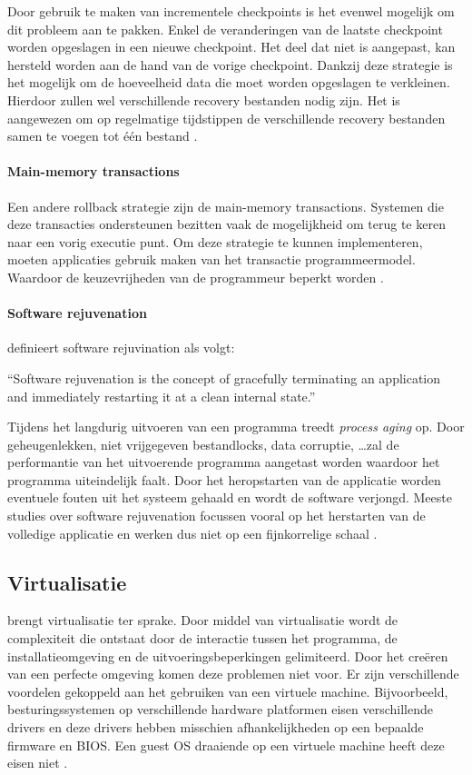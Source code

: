 Door gebruik te maken van incrementele checkpoints is het evenwel mogelijk om dit probleem aan te pakken.
Enkel de veranderingen van de laatste checkpoint worden opgeslagen in een nieuwe checkpoint.
Het deel dat niet is aangepast, kan hersteld worden aan de hand van de vorige checkpoint.
Dankzij deze strategie is het mogelijk om de hoeveelheid data die moet worden opgeslagen te verkleinen.
Hierdoor zullen wel verschillende recovery bestanden nodig zijn.
Het is aangewezen om op regelmatige tijdstippen de verschillende recovery bestanden samen te voegen tot één bestand \citep{plank1994libckpt, elnozahy2002survey}.

\paragraph{Main-memory transactions}
Een andere rollback strategie zijn de main-memory transactions.
Systemen die deze transacties ondersteunen bezitten vaak de mogelijkheid om terug te keren naar een vorig executie punt.
Om deze strategie te kunnen implementeren, moeten applicaties gebruik maken van het transactie programmeermodel.
Waardoor de keuzevrijheden van de programmeur beperkt worden \citep{srinivasan2004flashback}.

\paragraph{Software rejuvenation}
\citet{huang1995software} definieert software rejuvination als volgt:
\begin{displayquote}
``Software rejuvenation is the concept of gracefully terminating an application and immediately restarting it at a clean internal state.''
\end{displayquote}
Tijdens het langdurig uitvoeren van een programma treedt \emph{process aging} op.
Door geheugenlekken, niet vrijgegeven bestandlocks, data corruptie, \ldots zal de performantie van het uitvoerende programma aangetast worden waardoor het programma uiteindelijk faalt.
Door het heropstarten van de applicatie worden eventuele fouten uit het systeem gehaald en wordt de software verjongd.
Meeste studies over software rejuvenation focussen vooral op het herstarten van de volledige applicatie en werken dus niet op een fijnkorrelige schaal \citep{srinivasan2004flashback}.

\subsection{Virtualisatie}\label{sec:virtualisatie}
\citet{softwareDeployment} brengt virtualisatie ter sprake.
Door middel van virtualisatie wordt de complexiteit die ontstaat door de interactie tussen het programma, de installatieomgeving en de uitvoeringsbeperkingen gelimiteerd.
Door het creëren van een perfecte omgeving komen deze problemen niet voor.
Er zijn verschillende voordelen gekoppeld aan het gebruiken van een virtuele machine.
Bijvoorbeeld, besturingssystemen op verschillende hardware platformen eisen verschillende drivers en deze drivers hebben misschien afhankelijkheden op een bepaalde firmware en BIOS.
Een guest OS draaiende op een virtuele machine heeft deze eisen niet \citep{shumate2004implications}.

